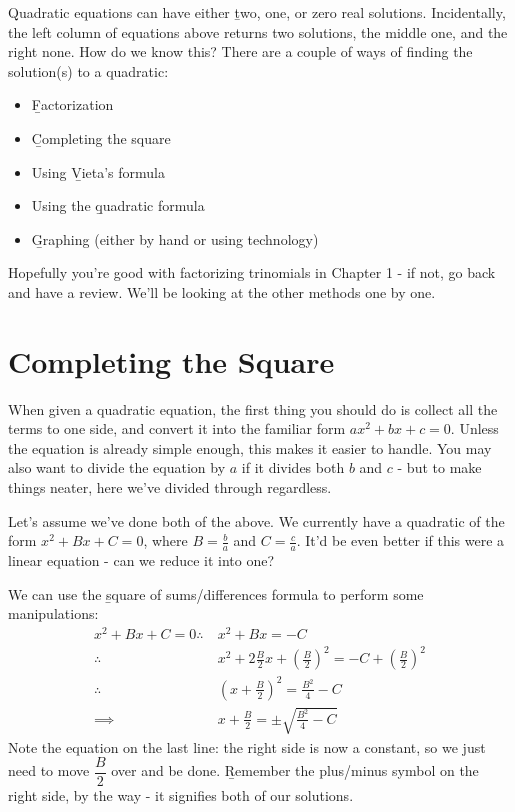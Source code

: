 \documentclass[../../main.tex]{subfiles}
\begin{document}
Quadratic equations can have either \b{two, one, or zero real solutions}. Incidentally, the left column of equations above returns two solutions, the middle one, and the right none. How do we know this?
\newpage
There are a couple of ways of finding the solution(s) to a quadratic:
\begin{itemize}
    \item \b{Factorization}
    \item \b{Completing the square}
    \item Using \b{Vieta's formula}
    \item Using the \b{quadratic formula}
    \item \b{Graphing} (either by hand or using technology)
\end{itemize}

Hopefully you're good with factorizing trinomials in Chapter 1 - if not, go back and have a review. We'll be looking at the other methods one by one.

\section{Completing the Square}
When given a quadratic equation, the first thing you should do is collect all the terms to one side, and convert it into the familiar form $ax^2+bx+c=0$. Unless the equation is already simple enough, this makes it easier to handle. You may also want to divide the equation by $a$ if it divides both $b$ and $c$ - but to make things neater, here we've divided through regardless.

Let's assume we've done both of the above. We currently have a quadratic of the form $x^2+Bx+C=0$, where $B=\frac{b}{a}$ and $C=\frac{c}{a}$. It'd be even better if this were a linear equation - can we reduce it into one?

We can use the \b{square of sums/differences} formula to perform some manipulations:
\begin{align}
    x^2+Bx+C=0\therefore\ &x^2+Bx=-C \\
    \therefore\ &x^2+2\frac{B}2x+\left(\frac{B}{2}\right)^2=-C+\left(\frac{B}{2}\right)^2 \\
    \therefore\ &\left(x+\frac{B}{2}\right)^2=\frac{B^2}{4}-C \\
    \implies&x+\frac{B}{2}=\pm\sqrt{\frac{B^2}{4}-C}
\end{align}
Note the equation on the last line: the right side is now a constant, so we just need to move $\dfrac B2$ over and be done. \b{Remember the plus/minus symbol on the right side, by the way} - it signifies both of our solutions.
\end{document}
